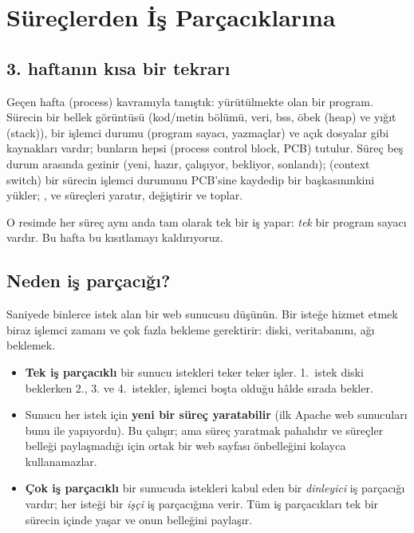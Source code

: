 \setcounter{tocdepth}{2}
\tableofcontents

\section{Süreçlerden İş Parçacıklarına}

\subsection{3. haftanın kısa bir tekrarı}

Geçen hafta  (process) kavramıyla tanıştık: yürütülmekte olan bir program. Sürecin bir bellek görüntüsü (kod/metin bölümü, veri, bss, öbek (heap) ve yığıt (stack)), bir işlemci durumu (program sayacı, yazmaçlar) ve açık dosyalar gibi kaynakları vardır; bunların hepsi  (process control block, PCB) tutulur. Süreç beş durum arasında gezinir (yeni, hazır, çalışıyor, bekliyor, sonlandı);  (context switch) bir sürecin işlemci durumunu PCB'sine kaydedip bir başkasınınkini yükler; ,  ve  süreçleri yaratır, değiştirir ve toplar.

O resimde her süreç aynı anda tam olarak tek bir iş yapar: \emph{tek} bir program sayacı vardır. Bu hafta bu kısıtlamayı kaldırıyoruz.

\subsection{Neden iş parçacığı?}

Saniyede binlerce istek alan bir web sunucusu düşünün. Bir isteğe hizmet etmek biraz işlemci zamanı ve çok fazla bekleme gerektirir: diski, veritabanını, ağı beklemek.

\begin{itemize}
  \item \textbf{Tek iş parçacıklı} bir sunucu istekleri teker teker işler. 1.~istek diski beklerken 2., 3. ve 4.~istekler, işlemci boşta olduğu hâlde sırada bekler.
  \item Sunucu her istek için \textbf{yeni bir süreç yaratabilir} (ilk Apache web sunucuları bunu  ile yapıyordu). Bu çalışır; ama süreç yaratmak pahalıdır ve süreçler belleği paylaşmadığı için ortak bir web sayfası önbelleğini kolayca kullanamazlar.
  \item \textbf{Çok iş parçacıklı} bir sunucuda istekleri kabul eden bir \emph{dinleyici} iş parçacığı vardır; her isteği bir \emph{işçi} iş parçacığına verir. Tüm iş parçacıkları tek bir sürecin içinde yaşar ve onun belleğini paylaşır.
\end{itemize}

